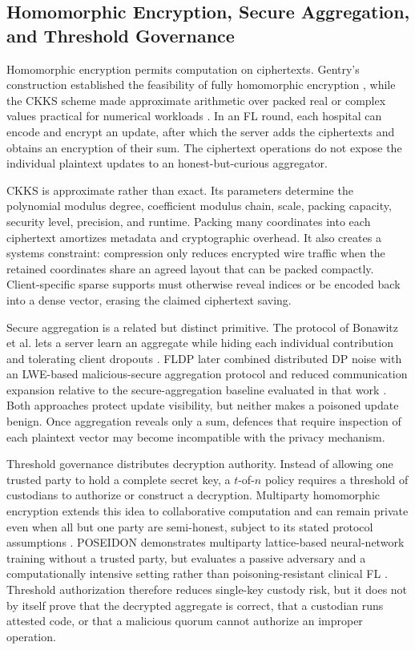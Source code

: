 \subsection{Homomorphic Encryption, Secure Aggregation, and Threshold Governance}

Homomorphic encryption permits computation on ciphertexts. Gentry's construction established the feasibility of fully homomorphic encryption \cite{gentry2009fully}, while the CKKS scheme made approximate arithmetic over packed real or complex values practical for numerical workloads \cite{cheon2017homomorphic}. In an FL round, each hospital can encode and encrypt an update, after which the server adds the ciphertexts and obtains an encryption of their sum. The ciphertext operations do not expose the individual plaintext updates to an honest-but-curious aggregator.

CKKS is approximate rather than exact. Its parameters determine the polynomial modulus degree, coefficient modulus chain, scale, packing capacity, security level, precision, and runtime. Packing many coordinates into each ciphertext amortizes metadata and cryptographic overhead. It also creates a systems constraint: compression only reduces encrypted wire traffic when the retained coordinates share an agreed layout that can be packed compactly. Client-specific sparse supports must otherwise reveal indices or be encoded back into a dense vector, erasing the claimed ciphertext saving.

Secure aggregation is a related but distinct primitive. The protocol of Bonawitz et al. lets a server learn an aggregate while hiding each individual contribution and tolerating client dropouts \cite{bonawitz2017practical}. FLDP later combined distributed DP noise with an LWE-based malicious-secure aggregation protocol and reduced communication expansion relative to the secure-aggregation baseline evaluated in that work \cite{stevens2022fldp}. Both approaches protect update visibility, but neither makes a poisoned update benign. Once aggregation reveals only a sum, defences that require inspection of each plaintext vector may become incompatible with the privacy mechanism.

Threshold governance distributes decryption authority. Instead of allowing one trusted party to hold a complete secret key, a $t$-of-$n$ policy requires a threshold of custodians to authorize or construct a decryption. Multiparty homomorphic encryption extends this idea to collaborative computation and can remain private even when all but one party are semi-honest, subject to its stated protocol assumptions \cite{mouchet2021multiparty}. POSEIDON demonstrates multiparty lattice-based neural-network training without a trusted party, but evaluates a passive adversary and a computationally intensive setting rather than poisoning-resistant clinical FL \cite{sav2021poseidon}. Threshold authorization therefore reduces single-key custody risk, but it does not by itself prove that the decrypted aggregate is correct, that a custodian runs attested code, or that a malicious quorum cannot authorize an improper operation.

